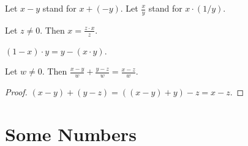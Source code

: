 \documentclass{article}
\begin{document}
\begin{forthel}
Let $x - y$ stand for $x + (-y)$.
Let $\frac{x}{y}$ stand for $x \cdot (1/y)$.

\begin{lemma} Let $z \neq 0$. Then
$x = \frac{z \cdot x}{z}$.
\end{lemma}

\begin{lemma}
$(1 - x) \cdot y = y - (x \cdot y)$.
\end{lemma}

\begin{lemma} Let $w \neq 0$. Then
$\frac{x - y}{w} + \frac{y - z}{w} = \frac{x - z}{w}$.
\end{lemma}
\begin{proof}
$(x - y) + (y - z) = ((x - y) + y) - z = x - z$.
\end{proof}

\end{forthel}

\section{Some Numbers}
\end{document}

